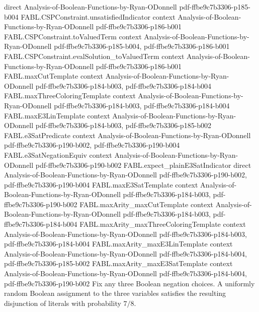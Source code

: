 \begin{theorem}
  {direct}
  {Analysis-of-Boolean-Functions-by-Ryan-ODonnell}
  {pdf-ffbe9c7b3306-p185-b004}
\proofstep
  {FABL.CSPConstraint.unsatisfiedIndicator}
  {context}
  {Analysis-of-Boolean-Functions-by-Ryan-ODonnell}
  {pdf-ffbe9c7b3306-p186-b001}
\proofstep
  {FABL.CSPConstraint.toValuedTerm}
  {context}
  {Analysis-of-Boolean-Functions-by-Ryan-ODonnell}
  {pdf-ffbe9c7b3306-p185-b004,
    pdf-ffbe9c7b3306-p186-b001}
\proofstep
  {FABL.CSPConstraint.evalSolution_toValuedTerm}
  {context}
  {Analysis-of-Boolean-Functions-by-Ryan-ODonnell}
  {pdf-ffbe9c7b3306-p186-b001}
\proofstep
  {FABL.maxCutTemplate}
  {context}
  {Analysis-of-Boolean-Functions-by-Ryan-ODonnell}
  {pdf-ffbe9c7b3306-p184-b003,
    pdf-ffbe9c7b3306-p184-b004}
\proofstep
  {FABL.maxThreeColoringTemplate}
  {context}
  {Analysis-of-Boolean-Functions-by-Ryan-ODonnell}
  {pdf-ffbe9c7b3306-p184-b003,
    pdf-ffbe9c7b3306-p184-b004}
\proofstep
  {FABL.maxE3LinTemplate}
  {context}
  {Analysis-of-Boolean-Functions-by-Ryan-ODonnell}
  {pdf-ffbe9c7b3306-p184-b003,
    pdf-ffbe9c7b3306-p185-b002}
\proofstep
  {FABL.e3SatPredicate}
  {context}
  {Analysis-of-Boolean-Functions-by-Ryan-ODonnell}
  {pdf-ffbe9c7b3306-p190-b002,
    pdf-ffbe9c7b3306-p190-b004}
\proofstep
  {FABL.e3SatNegationEquiv}
  {context}
  {Analysis-of-Boolean-Functions-by-Ryan-ODonnell}
  {pdf-ffbe9c7b3306-p190-b002}
\proofstep
  {FABL.expect_plainE3SatIndicator}
  {direct}
  {Analysis-of-Boolean-Functions-by-Ryan-ODonnell}
  {pdf-ffbe9c7b3306-p190-b002,
    pdf-ffbe9c7b3306-p190-b004}
\proofstep
  {FABL.maxE3SatTemplate}
  {context}
  {Analysis-of-Boolean-Functions-by-Ryan-ODonnell}
  {pdf-ffbe9c7b3306-p184-b003,
    pdf-ffbe9c7b3306-p190-b002}
\proofstep
  {FABL.maxArity_maxCutTemplate}
  {context}
  {Analysis-of-Boolean-Functions-by-Ryan-ODonnell}
  {pdf-ffbe9c7b3306-p184-b003,
    pdf-ffbe9c7b3306-p184-b004}
\proofstep
  {FABL.maxArity_maxThreeColoringTemplate}
  {context}
  {Analysis-of-Boolean-Functions-by-Ryan-ODonnell}
  {pdf-ffbe9c7b3306-p184-b003,
    pdf-ffbe9c7b3306-p184-b004}
\proofstep
  {FABL.maxArity_maxE3LinTemplate}
  {context}
  {Analysis-of-Boolean-Functions-by-Ryan-ODonnell}
  {pdf-ffbe9c7b3306-p184-b004,
    pdf-ffbe9c7b3306-p185-b002}
\proofstep
  {FABL.maxArity_maxE3SatTemplate}
  {context}
  {Analysis-of-Boolean-Functions-by-Ryan-ODonnell}
  {pdf-ffbe9c7b3306-p184-b004,
    pdf-ffbe9c7b3306-p190-b002}
Fix any three Boolean negation choices. A uniformly random Boolean assignment to the
three variables satisfies the resulting disjunction of literals with probability $7/8$.
\end{theorem}

